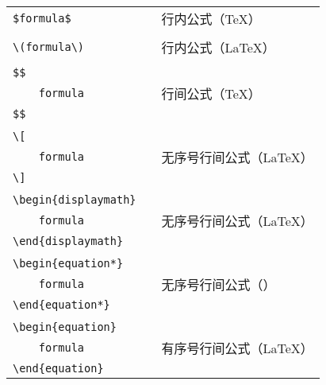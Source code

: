 \begin{table}[h]
	\centering
	\begin{tabular}{l p{6em} l}
		\verb|$|{\color{gray}\verb|formula|}\verb|$|   && 行内公式（\TeX） \\
		                                               && \\
		\verb|\(|{\color{gray}\verb|formula|}\verb|\)| && 行内公式（\LaTeX） \\
		                                               && \\
		\verb|$$|                                      && \\
		\verb|    |{\color{gray}\verb|formula|}        && 行间公式（\TeX） \\
		\verb|$$|                                      && \\
		                                               && \\
		\verb|\[|                                      && \\
		\verb|    |{\color{gray}\verb|formula|}        && 无序号行间公式（\LaTeX） \\
		\verb|\]|                                      && \\
		                                               && \\
		\verb|\begin{displaymath}|                     && \\
		\verb|    |{\color{gray}\verb|formula|}        && 无序号行间公式（\LaTeX） \\
		\verb|\end{displaymath}|                       && \\
		                                               && \\
		\verb|\begin{equation*}|                       && \\
		\verb|    |{\color{gray}\verb|formula|}        && 无序号行间公式（\AmS） \\
		\verb|\end{equation*}|                         && \\
		                                               && \\
		\verb|\begin{equation}|                        && \\
		\verb|    |{\color{gray}\verb|formula|}        && 有序号行间公式（\LaTeX） \\
		\verb|\end{equation}|                          && \\
	\end{tabular}
\end{table}
%


